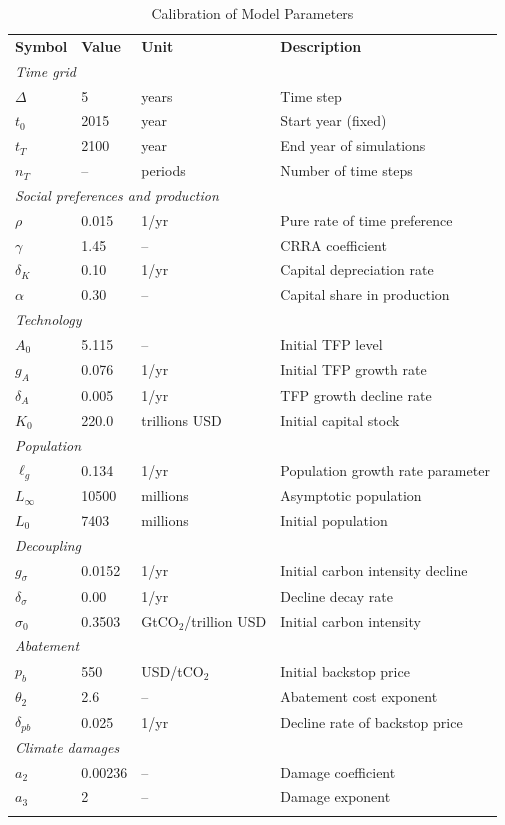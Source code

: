 \documentclass[11pt]{scrartcl}%
\theoremstyle{mytheoremstyle}
\theoremstyle{plain}
\begin{document}
\begin{table}[h]
\caption{Calibration of Model Parameters}%
\label{tab:calibration}%
\centering
\begin{tabular}
[c]{lllp{8cm}}%
\toprule \textbf{Symbol} & \textbf{Value} & \textbf{Unit} &
\textbf{Description}\\
\multicolumn{4}{l}{\textit{Time grid}}\\
$\Delta$ & 5 & years & Time step\\
$t_{0}$ & 2015 & year & Start year (fixed)\\
$t_{T}$ & 2100 & year & End year of simulations\\
$n_{T}$ & -- & periods & Number of time steps\\
\multicolumn{4}{l}{\textit{Social preferences and production}}\\
$\rho$ & 0.015 & 1/yr & Pure rate of time preference\\
$\gamma$ & 1.45 & -- & CRRA coefficient\\
$\delta_{K}$ & 0.10 & 1/yr & Capital depreciation rate\\
$\alpha$ & 0.30 & -- & Capital share in production\\
\multicolumn{4}{l}{\textit{Technology}}\\
$A_{0}$ & 5.115 & -- & Initial TFP level\\
$g_{A}$ & 0.076 & 1/yr & Initial TFP growth rate\\
$\delta_{A}$ & 0.005 & 1/yr & TFP growth decline rate\\
$K_{0}$ & 220.0 & trillions USD & Initial capital stock\\
\multicolumn{4}{l}{\textit{Population}}\\
$\ell_{g}$ & 0.134 & 1/yr & Population growth rate parameter\\
$L_{\infty}$ & 10500 & millions & Asymptotic population\\
$L_{0}$ & 7403 & millions & Initial population\\
\multicolumn{4}{l}{\textit{Decoupling}}\\
$g_{\sigma}$ & 0.0152 & 1/yr & Initial carbon intensity decline\\
$\delta_{\sigma}$ & 0.00 & 1/yr & Decline decay rate\\
$\sigma_{0}$ & 0.3503 & GtCO$_{2}$/trillion USD & Initial carbon intensity\\
\multicolumn{4}{l}{\textit{Abatement}}\\
$p_{b}$ & 550 & USD/tCO$_{2}$ & Initial backstop price\\
$\theta_{2}$ & 2.6 & -- & Abatement cost exponent\\
$\delta_{pb}$ & 0.025 & 1/yr & Decline rate of backstop price\\
\multicolumn{4}{l}{\textit{Climate damages}}\\
$a_{2}$ & 0.00236 & -- & Damage coefficient\\
$a_{3}$ & 2 & -- & Damage exponent\\
\bottomrule &  &  &
\end{tabular}
\end{table}
\end{document}
